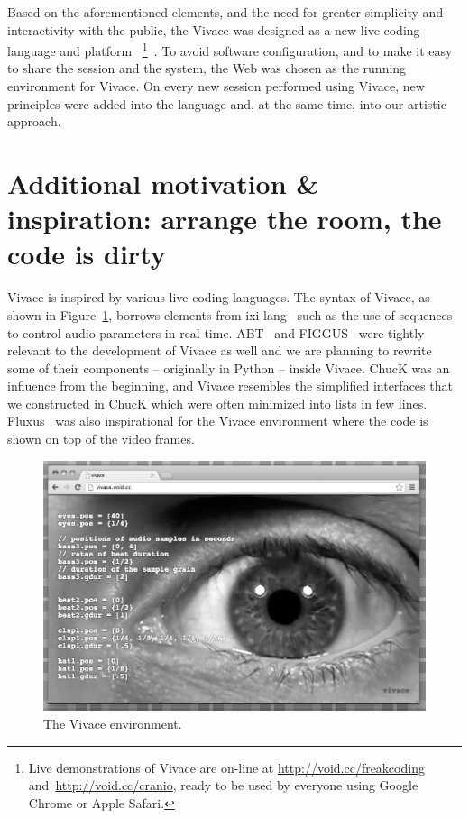 \documentclass[12pt,times,twocolumn]{article}
\begin{document}
Based on the aforementioned elements, and the need for greater simplicity
and interactivity with the public, the Vivace was designed as a new live coding language and platform
~\footnote{Live demonstrations of Vivace are on-line at
    \url{http://void.cc/freakcoding} and~\url{http://void.cc/cranio},
    ready to be used by everyone using
  Google Chrome or Apple Safari.}~\cite{Vivace}. To avoid software
configuration, and to make it easy to share the session and the
system, the Web was chosen as the running
environment for Vivace. On every new session performed using Vivace,
new principles were added into the language and, at the same time,
into our artistic approach.

\section{Additional motivation \& inspiration: arrange the room, the code is dirty}
Vivace is inspired by various live coding languages. The syntax of
Vivace, as shown in Figure~\ref{fig:vivace}, borrows elements from ixi
lang~\cite{magnusson2011ixi} such as the use of sequences to control
audio parameters in real time. ABT~\cite{fabbri} and
FIGGUS~\cite{fabbri2} were tightly relevant to the development of
Vivace as well and we are planning to rewrite some of their components
-- originally in Python -- inside Vivace.
ChucK was an influence from the beginning, and Vivace resembles the simplified
interfaces that we constructed in ChucK which were often minimized into lists in few lines.
Fluxus~\cite{fluxus} was also inspirational for the Vivace
environment where the code is shown on top of the video frames.

\begin{figure}[htpb]
  \begin{center}
    \includegraphics[scale=.4]{img/fig_vivace_.png}
    \caption{The Vivace environment.}
    \label{fig:vivace}
  \end{center}
\end{figure}
\end{document}
